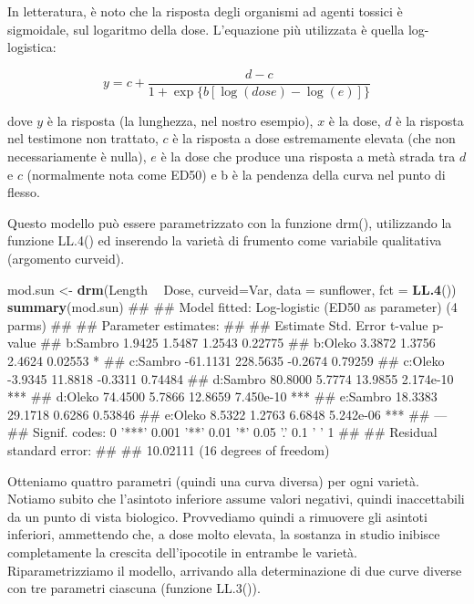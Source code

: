 \documentclass[a4paper,12pt,oneside]{book}
\newenvironment{Shaded}{\begin{snugshade}}{\end{snugshade}}
\newcommand{\KeywordTok}[1]{\textcolor[rgb]{0.13,0.29,0.53}{\textbf{#1}}}
\newcommand{\DataTypeTok}[1]{\textcolor[rgb]{0.13,0.29,0.53}{#1}}
\newcommand{\StringTok}[1]{\textcolor[rgb]{0.31,0.60,0.02}{#1}}
\newcommand{\OperatorTok}[1]{\textcolor[rgb]{0.81,0.36,0.00}{\textbf{#1}}}
\newcommand{\NormalTok}[1]{#1}
\theoremstyle{definition}
\theoremstyle{definition}
\theoremstyle{definition}
\theoremstyle{remark}
\begin{document}
In letteratura, è noto che la risposta degli organismi ad agenti tossici
è sigmoidale, sul logaritmo della dose. L'equazione più utilizzata è
quella log-logistica:

\[y = c + \frac{d - c}{1 + \exp \{ b[\log (dose) - \log (e)] \} }\]

dove \(y\) è la risposta (la lunghezza, nel nostro esempio), \(x\) è la
dose, \(d\) è la risposta nel testimone non trattato, \(c\) è la
risposta a dose estremamente elevata (che non necessariamente è nulla),
\(e\) è la dose che produce una risposta a metà strada tra \(d\) e \(c\)
(normalmente nota come ED50) e b è la pendenza della curva nel punto di
flesso.

Questo modello può essere parametrizzato con la funzione drm(),
utilizzando la funzione LL.4() ed inserendo la varietà di frumento come
variabile qualitativa (argomento curveid).

\begin{Shaded}
\begin{Highlighting}[]
\NormalTok{mod.sun <-}\StringTok{ }\KeywordTok{drm}\NormalTok{(Length }\OperatorTok{~}\StringTok{ }\NormalTok{Dose, }\DataTypeTok{curveid=}\NormalTok{Var, }\DataTypeTok{data =}\NormalTok{ sunflower, }\DataTypeTok{fct =} \KeywordTok{LL.4}\NormalTok{())}
\KeywordTok{summary}\NormalTok{(mod.sun)}
\NormalTok{## }
\NormalTok{## Model fitted: Log-logistic (ED50 as parameter) (4 parms)}
\NormalTok{## }
\NormalTok{## Parameter estimates:}
\NormalTok{## }
\NormalTok{##           Estimate Std. Error t-value   p-value    }
\NormalTok{## b:Sambro    1.9425     1.5487  1.2543   0.22775    }
\NormalTok{## b:Oleko     3.3872     1.3756  2.4624   0.02553 *  }
\NormalTok{## c:Sambro  -61.1131   228.5635 -0.2674   0.79259    }
\NormalTok{## c:Oleko    -3.9345    11.8818 -0.3311   0.74484    }
\NormalTok{## d:Sambro   80.8000     5.7774 13.9855 2.174e-10 ***}
\NormalTok{## d:Oleko    74.4500     5.7866 12.8659 7.450e-10 ***}
\NormalTok{## e:Sambro   18.3383    29.1718  0.6286   0.53846    }
\NormalTok{## e:Oleko     8.5322     1.2763  6.6848 5.242e-06 ***}
\NormalTok{## ---}
\NormalTok{## Signif. codes:  0 '***' 0.001 '**' 0.01 '*' 0.05 '.' 0.1 ' ' 1}
\NormalTok{## }
\NormalTok{## Residual standard error:}
\NormalTok{## }
\NormalTok{##  10.02111 (16 degrees of freedom)}
\end{Highlighting}
\end{Shaded}

Otteniamo quattro parametri (quindi una curva diversa) per ogni varietà.
Notiamo subito che l'asintoto inferiore assume valori negativi, quindi
inaccettabili da un punto di vista biologico. Provvediamo quindi a
rimuovere gli asintoti inferiori, ammettendo che, a dose molto elevata,
la sostanza in studio inibisce completamente la crescita dell'ipocotile
in entrambe le varietà. Riparametrizziamo il modello, arrivando alla
determinazione di due curve diverse con tre parametri ciascuna (funzione
LL.3()).
\end{document}
